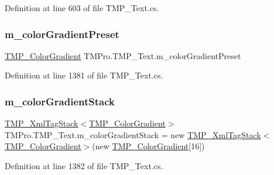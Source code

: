 Definition at line 603 of file T\+M\+P\+\_\+\+Text.\+cs.

\mbox{\label{class_t_m_pro_1_1_t_m_p___text_a3f9532b9b26023e97f7a03391ddec240}} 
\subsubsection{\texorpdfstring{m\_colorGradientPreset}{m\_colorGradientPreset}}
{\footnotesize\ttfamily \mbox{\hyperlink{class_t_m_pro_1_1_t_m_p___color_gradient}{T\+M\+P\+\_\+\+Color\+Gradient}} T\+M\+Pro.\+T\+M\+P\+\_\+\+Text.\+m\+\_\+color\+Gradient\+Preset\hspace{0.3cm}{\ttfamily [protected]}}



Definition at line 1381 of file T\+M\+P\+\_\+\+Text.\+cs.

\mbox{\label{class_t_m_pro_1_1_t_m_p___text_a4217eed6fe5eb53525d29ea242748c8c}} 
\subsubsection{\texorpdfstring{m\_colorGradientStack}{m\_colorGradientStack}}
{\footnotesize\ttfamily \mbox{\hyperlink{struct_t_m_pro_1_1_t_m_p___xml_tag_stack}{T\+M\+P\+\_\+\+Xml\+Tag\+Stack}}$<$\mbox{\hyperlink{class_t_m_pro_1_1_t_m_p___color_gradient}{T\+M\+P\+\_\+\+Color\+Gradient}}$>$ T\+M\+Pro.\+T\+M\+P\+\_\+\+Text.\+m\+\_\+color\+Gradient\+Stack = new \mbox{\hyperlink{struct_t_m_pro_1_1_t_m_p___xml_tag_stack}{T\+M\+P\+\_\+\+Xml\+Tag\+Stack}}$<$\mbox{\hyperlink{class_t_m_pro_1_1_t_m_p___color_gradient}{T\+M\+P\+\_\+\+Color\+Gradient}}$>$(new \mbox{\hyperlink{class_t_m_pro_1_1_t_m_p___color_gradient}{T\+M\+P\+\_\+\+Color\+Gradient}}\mbox{[}16\mbox{]})\hspace{0.3cm}{\ttfamily [protected]}}



Definition at line 1382 of file T\+M\+P\+\_\+\+Text.\+cs.

\mbox{\label{class_t_m_pro_1_1_t_m_p___text_af1d4cf0db47d8a8db522e165216c6ab7}} 
